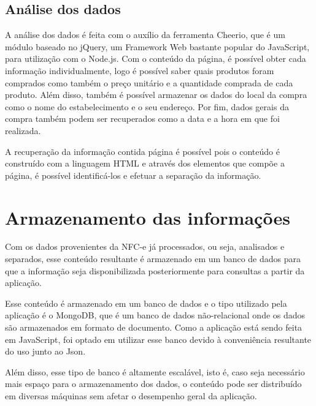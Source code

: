 \subsection{Análise dos dados}

A análise dos dados é feita com o auxílio da ferramenta Cheerio\cite{cheerio}, que é um módulo baseado no jQuery, um Framework Web bastante popular do JavaScript\cite{stackOverflowRanking}, para utilização com o Node.js. Com o conteúdo da página, é possível obter cada informação individualmente, logo é possível saber quais produtos foram comprados como também o preço unitário e a quantidade comprada de cada produto. Além disso, também é possível armazenar os dados do local da compra como o nome do estabelecimento e o seu endereço. Por fim, dados gerais da compra também podem ser recuperados como a data e a hora em que foi realizada.

A recuperação da informação contida página é possível pois o conteúdo é construído com a linguagem HTML e através dos elementos que compõe a página, é possível identificá-los e efetuar a separação da informação.

\section{Armazenamento das informações}
\label{armazenamentoInfo}

Com os dados provenientes da NFC-e já processados, ou seja, analisados e separados, esse conteúdo resultante é armazenado em um banco de dados para que a informação seja disponibilizada posteriormente para consultas a partir da aplicação.

Esse conteúdo é armazenado em um banco de dados e o tipo utilizado pela aplicação é o MongoDB, que é um banco de dados não-relacional onde os dados são armazenados em formato de documento. Como a aplicação está sendo feita em JavaScript, foi optado em utilizar esse banco devido à conveniência resultante do uso junto ao Json.

Além disso, esse tipo de banco é altamente escalável, isto é, caso seja necessário mais espaço para o armazenamento dos dados, o conteúdo pode ser distribuído em diversas máquinas sem afetar o desempenho geral da aplicação.

